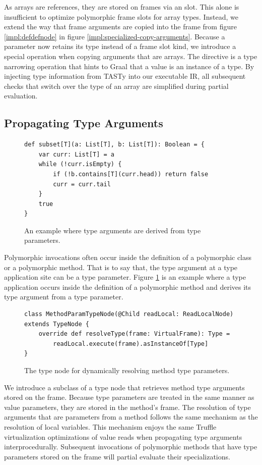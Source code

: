 As arrays are references, they are stored on frames via an  slot.
This alone is insufficient to optimize polymorphic frame slots for array types.
Instead, we extend the way that frame arguments are copied into the frame from figure \ref{impl:defdefnode} in figure \ref{impl:specialized-copy-arguments}.
Because a parameter now retains its type instead of a frame slot kind, we introduce a special operation when copying arguments that are arrays. 
The  directive is a type narrowing operation that hints to Graal that a value is an instance of a type.
By injecting type information from TASTy into our executable IR, all subsequent checks that switch over the type of an array are simplified during partial evaluation.

\subsection{Propagating Type Arguments}

\begin{figure}[!htb]
\begin{verbatim}
def subset[T](a: List[T], b: List[T]): Boolean = {
	var curr: List[T] = a
	while (!curr.isEmpty) {
		if (!b.contains[T](curr.head)) return false
		curr = curr.tail
	}
	true 
}
\end{verbatim}
\caption{An example where type arguments are derived from type parameters.}
\label{impl:list-subset}
\end{figure}

Polymorphic invocations often occur inside the definition of a polymorphic class or a polymorphic method.
That is to say that, the type argument at a type application site can be a type parameter.
Figure \ref{impl:list-subset} is an example where a type application occurs inside the definition of a polymorphic method and derives its type argument from a type parameter.

\begin{figure}[!htb]
\begin{verbatim}
class MethodParamTypeNode(@Child readLocal: ReadLocalNode) extends TypeNode {
	override def resolveType(frame: VirtualFrame): Type = 
		readLocal.execute(frame).asInstanceOf[Type]
}
\end{verbatim}
\caption{The type node for dynamically resolving method type parameters.}
\label{impl:method-param-typenode}
\end{figure}

We introduce a subclass of a type node that retrieves method type arguments stored on the frame.
Because type parameters are treated in the same manner as value parameters, they are stored in the method's frame.
The resolution of type arguments that are parameters from a method follows the same mechanism as the resolution of local variables.
This mechanism enjoys the same Truffle virtualization optimizations of value reads when propagating type arguments interprocedurally.
Subsequent invocations of polymorphic methods that have type parameters stored on the frame will partial evaluate their specializations.

